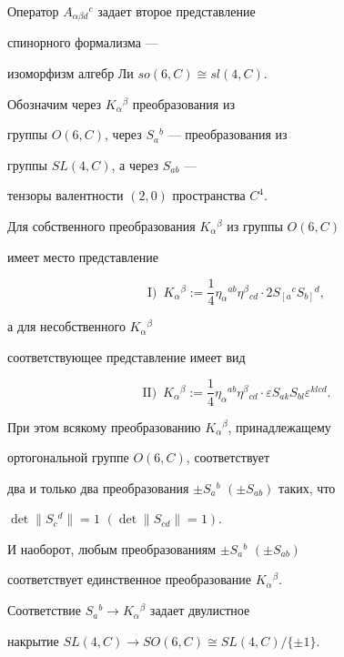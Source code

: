 Оператор $A_{\alpha \beta d}{}^c$ задает второе представление


спинорного формализма ---


изоморфизм алгебр Ли $so(6,C)\cong sl(4,C)$.





Обозначим через $K_\alpha{}^\beta$ преобразования из


группы $O(6,C)$, через $S_a{}^b$ --- преобразования из


группы $SL(4,C)$, а через $S_{ab}$ ---


тензоры валентности $(2,0)$ пространства $C^4$.





\begin{thm}


\label{theorem1}


Для собственного преобразования $K_\alpha{}^\beta$ из группы $O(6,C)$


имеет место представление


\begin{equation}


\label{e8}


\mathrm I)\ \; K_\alpha{}^\beta:=


\frac{1}{4}\eta_\alpha{}^{ab}\eta^\beta{}_{cd}


\cdot 2S_{\left[ a \right.}{}^c S_{\left. b \right]}{}^d,


\end{equation}


а для несобственного $K_\alpha{}^\beta$


соответствующее представление имеет вид


\begin{equation}


\label{e9}


\mathrm{II})\ \; K_\alpha{}^\beta:=


\frac{1}{4}\eta_\alpha{}^{ab}\eta^\beta{}_{cd}


\cdot\varepsilon S_{ak} S_{bl}\varepsilon^{klcd}.


\end{equation}


При этом всякому преобразованию $K_\alpha{}^\beta$, принадлежащему


ортогональной группе $O(6,C)$, соответствует


два и только два преобразования $\pm S_a{}^b$ $(\pm S_{ab})$ таких, что


$\det\| S_c{}^d \|{=}1$ $(\det\| S_{cd} \|{=}1)$.


И наоборот, любым преобразованиям $\pm S_a{}^b$ $(\pm S_{ab})$


соответствует единственное преобразование $K_\alpha{}^\beta$.


Соответствие $S_a{}^b \to K_\alpha{}^\beta$ задает двулистное


накрытие $SL(4,C) \to SO(6,C) \cong SL(4,C)/\{\pm 1\}$.


\end{thm}





